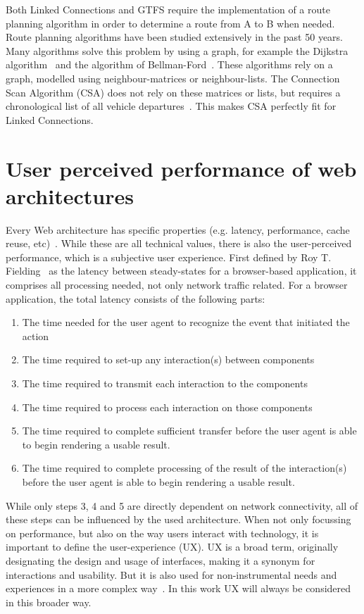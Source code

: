 \documentclass[twocolumn]{phdsymp} %
\begin{document}
Both Linked Connections and \textsc{GTFS} require the implementation of a route planning algorithm in order to determine a route from A to B when needed. Route planning algorithms have been studied extensively in the past 50 years. Many algorithms solve this problem by using a graph, for example the Dijkstra algorithm~\cite{dijkstra} and the algorithm of Bellman-Ford~\cite{bellmanford}. These algorithms rely on a graph, modelled using neighbour-matrices or neighbour-lists. The Connection Scan Algorithm (CSA) does not rely on these matrices or lists, but requires a chronological list of all vehicle departures~\cite{csa}. This makes \textsc{CSA} perfectly fit for Linked Connections.

\section{User perceived performance of web architectures}
Every Web architecture has specific properties (e.g. latency, performance, cache reuse, etc)~\cite{verborgh16}. While these are all technical values, there is also the user-perceived performance, which is a subjective user experience. First defined by Roy T. Fielding~\cite{fielding99} as the latency between steady-states for a browser-based application, it comprises all processing needed, not only network traffic related. For a browser application, the total latency consists of the following parts:
\begin{enumerate}
	\item The time needed for the user agent to recognize the event that initiated the action
	\item The time required to set-up any interaction(s) between components
	\item The time required to transmit each interaction to the components
	\item The time required to process each interaction on those components
	\item The time required to complete sufficient transfer before the user agent is able to begin rendering a usable result.
	\item The time required to complete processing of the result of the interaction(s) before the user agent is able to begin rendering a usable result.
\end{enumerate}

While only steps 3, 4 and 5 are directly dependent on network connectivity, all of these steps can be influenced by the used architecture. When not only focussing on performance, but also on the way users interact with technology, it is important to define the user-experience (UX). \textsc{UX} is a broad term, originally designating the design and usage of interfaces, making it a synonym for interactions and usability. But it is also used for non-instrumental needs and experiences in a more complex way~\cite{avila11}. In this work \textsc{UX} will always be considered in this broader way.
\end{document}
